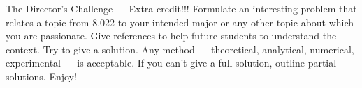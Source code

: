 \documentclass[makesolutionspdf]{esg8022pset}
\begin{document}
\begin{solution}
\end{solution}


\begin{problem}{The Director's Challenge --- Extra credit!!!}
  Formulate an interesting problem that relates a topic from 8.022 to your
  intended major or any other topic about which you are passionate.  Give references
  to help future students to understand the context.  Try to give a solution.
  Any method --- theoretical, analytical, numerical, experimental --- is acceptable.
  If you can't give a full solution, outline partial solutions. Enjoy!
\end{problem}
\end{document}
